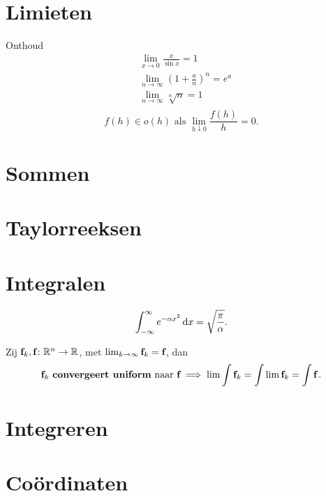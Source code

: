 \documentclass{article}
\begin{document}
    \tableofcontents
    \newpage

    \section{Limieten}\label{sec:limieten}
    Onthoud
    \begin{align*}
        &\lim_{x\to 0} \frac{x}{\sin x} = 1 \\
        &\lim_{n \to \infty} \left( 1 + \frac a n \right)^n = e^a \\
        &\lim_{n \to \infty} \sqrt[n]{n} = 1 \\
    \end{align*}
    \[
        f(h) \in o(h) \text{ als } \lim_{h \downarrow 0} \frac{f(h)}{h} = 0.
    \]
    \section{Sommen}\label{sec:sommen}
    

    \section{Taylorreeksen}\label{sec:taylorreeksen}
    

    \section{Integralen}\label{sec:integralen}

    \begin{stelling}
        \[ \int_{-\infty}^\infty e^{-\alpha x^2} \mathop{}\!\mathrm{d} x = \sqrt {\frac \pi \alpha}.\]
    \end{stelling}

    \begin{stelling}
        Zij ${\textbf{f}}_k,{\textbf{f}} \colon \mathbb{R}^n \to \mathbb{R}$, met $\lim_{k \to \infty} {\textbf{f}}_k = {\textbf{f}}$, dan
        \[ {\textbf{f}}_k \text { \textbf{convergeert uniform} naar } {\textbf{f}} \implies \lim \int {\textbf{f}}_k = \int \lim {\textbf{f}}_k = \int {\textbf{f}} \,. \]
    \end{stelling}

    \section{Integreren}\label{sec:integreren}
    

    \section{Co\"ordinaten}\label{sec:coordinaten}
    
\end{document}
